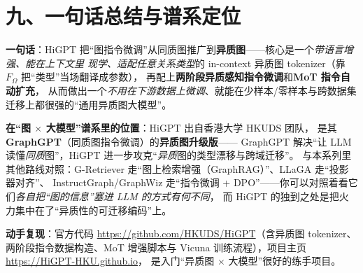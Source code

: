 \documentclass[11pt,UTF8,fontset=fandol]{ctexart}
\begin{document}
\section{九、一句话总结与谱系定位}

\textbf{一句话}：HiGPT 把“图指令微调”从同质图推广到\textbf{异质图}——核心是一个\emph{带语言增强、能在上下文里
现学、适配任意关系类型}的 in-context 异质图 tokenizer（靠 $F_{\Omega}$ 把“类型”当场翻译成参数），
再配上\textbf{两阶段异质感知指令微调}和\textbf{MoT 指令自动扩充}，
从而做出一个\emph{不用在下游数据上微调}、就能在少样本/零样本与跨数据集迁移上都很强的“通用异质图大模型”。

\textbf{在“图 $\times$ 大模型”谱系里的位置}：HiGPT 出自香港大学 HKUDS 团队，
是其 \textbf{GraphGPT}（同质图指令微调）的\textbf{异质图升级版}——
GraphGPT 解决“让 LLM 读懂\emph{同质}图”，HiGPT 进一步攻克“\emph{异质}图的类型漂移与跨域迁移”。
与本系列里其他路线对照：G-Retriever 走“图上检索增强（GraphRAG）”、LLaGA 走“投影器对齐”、
InstructGraph/GraphWiz 走“指令微调 + DPO”——你可以对照着看它们\emph{各自把“图的信息”塞进 LLM 的方式有何不同}，
而 HiGPT 的独到之处是把火力集中在了“异质性的可迁移编码”上。

\textbf{动手复现}：官方代码 \url{https://github.com/HKUDS/HiGPT}（含异质图 tokenizer、
两阶段指令数据构造、MoT 增强脚本与 Vicuna 训练流程），项目主页 \url{https://HiGPT-HKU.github.io}，
是入门“异质图 $\times$ 大模型”很好的练手项目。
\end{document}
